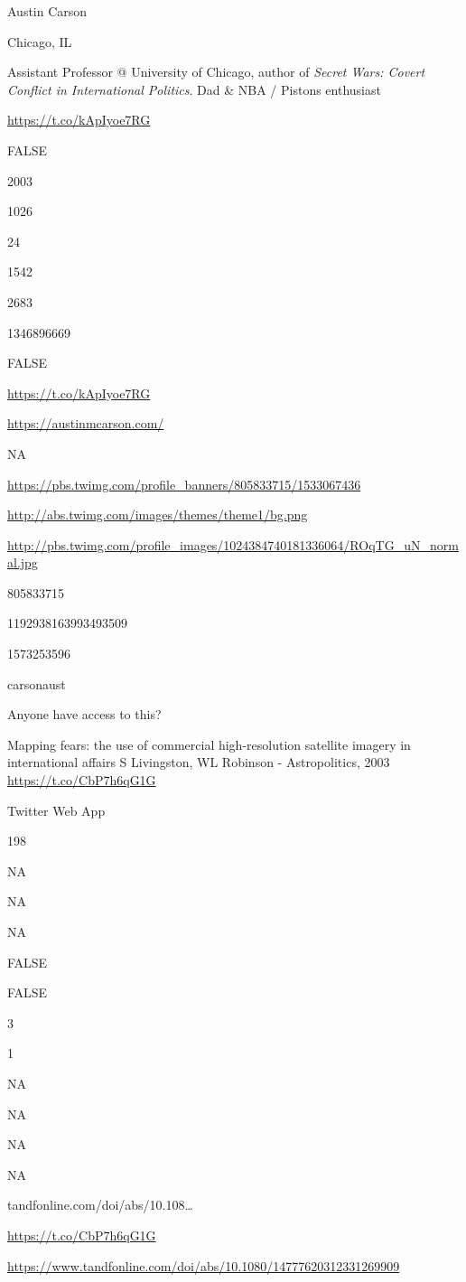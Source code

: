 \documentclass[]{book}
\begin{document}
Austin Carson

Chicago, IL

Assistant Professor @ University of Chicago, author of \emph{Secret Wars: Covert Conflict in International Politics}. Dad \& NBA / Pistons enthusiast

\url{https://t.co/kApIyoe7RG}

FALSE

2003

1026

24

1542

2683

1346896669

FALSE

\url{https://t.co/kApIyoe7RG}

\url{https://austinmcarson.com/}

NA

\url{https://pbs.twimg.com/profile_banners/805833715/1533067436}

\url{http://abs.twimg.com/images/themes/theme1/bg.png}

\url{http://pbs.twimg.com/profile_images/1024384740181336064/ROqTG_uN_normal.jpg}

805833715

1192938163993493509

1573253596

carsonaust

Anyone have access to this?

Mapping fears: the use of commercial high-resolution satellite imagery in international affairs
S Livingston, WL Robinson - Astropolitics, 2003
\url{https://t.co/CbP7h6qG1G}

Twitter Web App

198

NA

NA

NA

FALSE

FALSE

3

1

NA

NA

NA

NA

tandfonline.com/doi/abs/10.108\ldots{}

\url{https://t.co/CbP7h6qG1G}

\url{https://www.tandfonline.com/doi/abs/10.1080/14777620312331269909}
\end{document}
